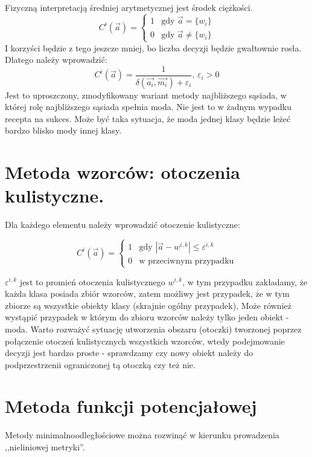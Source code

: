 \documentclass[a4paper,10pt]{article}
\begin{document}
Fizyczną interpretacją średniej arytmetycznej jest środek ciężkości.
\begin{equation}
 C^i(\overrightarrow{a}) = 
\begin{cases} 1 & \mbox{gdy }\overrightarrow{a} = \{w_i\}\\
 0 & \mbox{gdy }\overrightarrow{a} \neq \{w_i\}
\end{cases}
\end{equation}
I korzyści będzie z tego jeszcze mniej, bo liczba decyzji będzie gwałtownie rosła. Dlatego należy wprowadzić:
\begin{equation}
C^i(\overrightarrow{a}) = \frac{1}{\delta(\overrightarrow{a_i}, \overrightarrow{m_i}) + \varepsilon_i}\mbox{, }    \varepsilon_i > 0 
\end{equation}
Jest to uproszczony, zmodyfikowany wariant metody najbliższego sąsiada, w której rolę najbliższego sąsiada spełnia moda.
Nie jest to w żadnym wypadku recepta na sukces. Może być taka sytuacja, że moda jednej klasy będzie leżeć bardzo blisko mody innej klasy.

\section{Metoda wzorców: otoczenia kulistyczne.}
Dla każdego elementu należy wprowadzić otoczenie kulistyczne:

\begin{equation}
 C^i(\overrightarrow{a}) = 
\begin{cases} 1 & \mbox{gdy $|\overrightarrow{a} - w^{i,k}| \leq \varepsilon^{i,k}$}\\
 0 & \mbox{w przeciwnym przypadku}
\end{cases}
\end{equation}

$\varepsilon^{i,k}$ jest to promień otoczenia kulistycznego $w^{i,k}$, w tym przypadku zakładamy, że każda klasa posiada zbiór wzorców, zatem możliwy jest przypadek, że w tym zbiorze są wszystkie obiekty klasy (skrajnie ogólny przypadek), Może również wystąpić przypadek w którym do zbioru wzorców należy tylko jeden obiekt - moda.
Warto rozważyć sytuację utworzenia obszaru (otoczki) tworzonej poprzez połączenie otoczeń kulistycznych wszystkich wzorców, wtedy podejmowanie decyzji jest bardzo proste - sprawdzamy czy nowy obiekt należy do podprzestrzenii ograniczonej tą otoczką czy też nie.

\section{Metoda funkcji potencjałowej}
Metody minimalnoodległościowe można rozwinąć w kierunku prowadzenia ,,nieliniowej metryki''.
\end{document}
